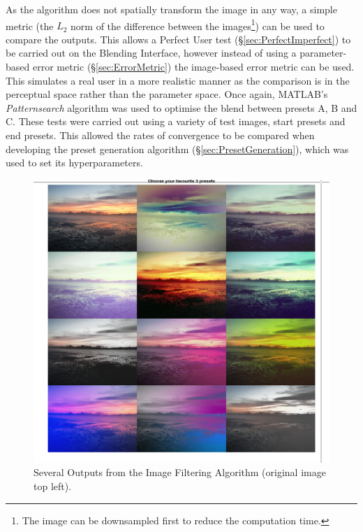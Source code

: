 \documentclass[11pt, oneside]{report}   	%
\begin{document}
As the algorithm does not spatially transform the image in any way, a simple metric (the $L_2$ norm of the difference between the images\footnote{The image can be downsampled first to reduce the computation time.}) can be used to compare the outputs. This allows a Perfect User test (\S \ref{sec:PerfectImperfect}) to be carried out on the Blending Interface, however instead of using a parameter-based error metric (\S \ref{sec:ErrorMetric}) the image-based error metric can be used. This simulates a real user in a more realistic manner as the comparison is in the perceptual space rather than the parameter space. Once again, MATLAB's \emph{Patternsearch} algorithm was used to optimise the blend between presets A, B and C. These tests were carried out using a variety of test images, start presets and end presets. This allowed the rates of convergence to be compared when developing the preset generation algorithm (\S \ref{sec:PresetGeneration}), which was used to set its hyperparameters.

\begin{figure}[h]
	\hspace{-30pt}
	\includegraphics[trim = {0.5cm, 12.5cm, 2cm, 1cm}, clip, width = 7in]{ImageEditing.png}
	\caption{Several Outputs from the Image Filtering Algorithm (original image top left).}
	\label{fig:ImageFIlteringOutput}
	\vspace{-20pt}
\end{figure}
\end{document}
